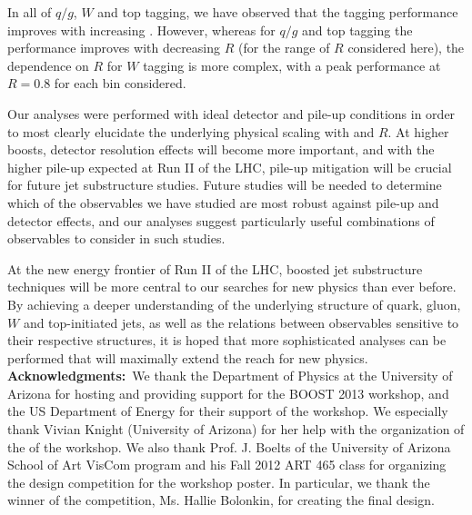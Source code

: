 In all of $q/g$, $W$ and top tagging, we have observed that the tagging performance improves with increasing \pt. However, whereas for $q/g$ and top tagging the performance improves with decreasing $R$ (for the range of $R$ considered here), the dependence on $R$ for $W$ tagging is more complex, with a peak performance at $R=0.8$ for each \pt bin considered. 

Our analyses were performed with ideal detector and pile-up conditions in order to most clearly elucidate the underlying physical scaling with \pt and $R$. At higher boosts, detector resolution effects will become more important, and with the higher pile-up expected at Run II of the LHC, pile-up mitigation will be crucial for future jet substructure studies. Future studies will be needed to determine which of the observables we have studied are most robust against pile-up and detector effects, and our analyses suggest particularly useful combinations of observables to consider in such studies. 

At the new energy frontier of Run II of the LHC, boosted jet substructure techniques will be more central to our searches for new physics than ever before. By achieving a deeper understanding of the underlying structure of quark, gluon, $W$ and top-initiated jets, as well as the relations between observables sensitive to their respective structures, it is hoped that more sophisticated analyses can be performed that will maximally extend the reach for new physics.\\

{\bf Acknowledgments:}~We thank the Department of Physics at the University of Arizona for hosting 
and providing support for the BOOST 2013 workshop, and the US Department of Energy for their support of the workshop.  We especially thank Vivian Knight (University of Arizona)
for her help with the organization of the of the workshop.  
We also thank Prof. J. Boelts of the University of Arizona School of Art VisCom program and his Fall 2012 ART 465 class for organizing the design competition for the workshop 
poster. In particular, we thank the winner of the competition, Ms. Hallie Bolonkin, for creating the final design.
